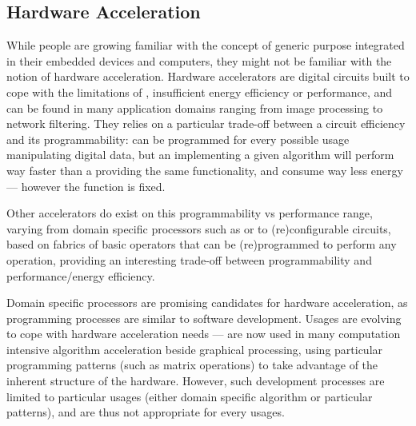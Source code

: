     \subsection{Hardware Acceleration}
    \label{ch.problem:sec.hardware:ssec.acceleration}
        While people are growing familiar with the concept of generic purpose  integrated in their embedded devices and computers, they might not be familiar with the notion of hardware acceleration.
        Hardware accelerators are digital circuits built to cope with the limitations of , \ie insufficient energy efficiency or performance, and can be found in many application domains ranging from image processing to network filtering.
        They relies on a particular trade-off between a circuit efficiency and its programmability:  can be programmed for every possible usage manipulating digital data, but an  implementing a given algorithm will perform way faster than a  providing the same functionality, and consume way less energy --- however the  function is fixed.

        Other accelerators do exist on this programmability {\tn vs} performance range, varying from domain specific processors such as  or  to (re)configurable circuits, based on fabrics of basic operators that can be (re)programmed to perform any operation, providing an interesting trade-off between programmability and performance/energy efficiency.

        Domain specific processors are promising candidates for hardware acceleration, as programming processes are similar to software development.
        Usages are evolving to cope with hardware acceleration needs --- \eg {} are now used in many computation intensive algorithm acceleration beside graphical processing, using particular programming patterns (such as matrix operations) to take advantage of the inherent structure of the hardware.
        However, such development processes are limited to particular usages (either domain specific algorithm or particular patterns), and are thus not appropriate for every usages.

